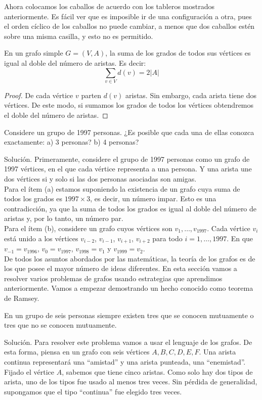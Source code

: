 \documentclass[11pt]{scrartcl}
\begin{document}
Ahora colocamos los caballos de acuerdo con los tableros mostrados anteriormente. Es fácil ver que es imposible ir de una configuración a otra, pues el orden cíclico de los caballos no puede cambiar, a menos que dos caballos estén sobre una misma casilla, y esto no es permitido.

\begin{theorem}
En un grafo simple $G = (V,A)$, la suma de los grados de todos sus vértices es igual al doble del número de aristas. Es decir:
\[
\sum_{v \in V} d(v) = 2|A|
\]
\end{theorem}
\begin{proof} De cada vértice $v$ parten $d(v)$ aristas. Sin embargo, cada arista tiene dos vértices. De este modo, si sumamos los grados de todos los vértices obtendremos el doble del número de aristas.\end{proof}

\begin{example}
Considere un grupo de 1997 personas. ¿Es posible que cada una de ellas conozca exactamente:
a) 3 personas?
b) 4 personas?
\end{example}
Solución. Primeramente, considere el grupo de 1997 personas como un grafo de 1997 vértices, en el que cada vértice representa a una persona. Y una arista une dos vértices si y solo si las dos personas asociadas son amigas.\\
Para el ítem (a) estamos suponiendo la existencia de un grafo cuya suma de todos los grados es $1997 \times 3$, es decir, un número impar. Esto es una contradicción, ya que la suma de todos los grados es igual al doble del número de aristas y, por lo tanto, un número par.\\

Para el ítem (b), considere un grafo cuyos vértices son $v_1, \ldots, v_{1997}$. Cada vértice $v_i$ está unido a los vértices $v_{i-2}$, $v_{i-1}$, $v_{i+1}$, $v_{i+2}$ para todo $i = 1, \ldots, 1997$. En que $v_{-1}=v_{1996}$, $v_{0}=v_{1997}$, $v_{1998}=v_1$ y $v_{1999}=v_2 $.\\

De todos los asuntos abordados por las matemáticas, la teoría de los grafos es de los que posee el mayor número de ideas diferentes. En esta sección vamos a resolver varios problemas de grafos usando estrategias que aprendimos anteriormente. Vamos a empezar demostrando un hecho conocido como teorema de Ramsey.

\begin{example}
    En un grupo de seis personas siempre existen tres que se conocen mutuamente o tres que no se conocen mutuamente.
\end{example}
Solución. Para resolver este problema vamos a usar el lenguaje de los grafos. De esta forma, piensa en un grafo con seis vértices $A, B, C, D, E, F$. Una arista continua representará una “amistad” y una arista punteada, una “enemistad”. Fijado el vértice $A$, sabemos que tiene cinco aristas. Como solo hay dos tipos de arista, uno de los tipos fue usado al menos tres veces. Sin pérdida de generalidad, supongamos que el tipo “continua” fue elegido tres veces.\\
\end{document}
